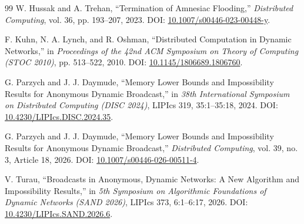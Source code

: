 \documentclass[11pt]{article}
\begin{document}
\begin{thebibliography}{99}
W. Hussak and A. Trehan,
``Termination of Amnesiac Flooding,''
\emph{Distributed Computing}, vol. 36, pp. 193--207, 2023.
DOI: \href{https://doi.org/10.1007/s00446-023-00448-y}{10.1007/s00446-023-00448-y}.

F. Kuhn, N. A. Lynch, and R. Oshman,
``Distributed Computation in Dynamic Networks,''
in \emph{Proceedings of the 42nd ACM Symposium on Theory of Computing (STOC 2010)},
pp. 513--522, 2010.
DOI: \href{https://doi.org/10.1145/1806689.1806760}{10.1145/1806689.1806760}.

G. Parzych and J. J. Daymude,
``Memory Lower Bounds and Impossibility Results for Anonymous Dynamic Broadcast,''
in \emph{38th International Symposium on Distributed Computing (DISC 2024)},
LIPIcs 319, 35:1--35:18, 2024.
DOI: \href{https://doi.org/10.4230/LIPIcs.DISC.2024.35}{10.4230/LIPIcs.DISC.2024.35}.

G. Parzych and J. J. Daymude,
``Memory Lower Bounds and Impossibility Results for Anonymous Dynamic Broadcast,''
\emph{Distributed Computing}, vol. 39, no. 3, Article 18, 2026.
DOI: \href{https://doi.org/10.1007/s00446-026-00511-4}{10.1007/s00446-026-00511-4}.

V. Turau,
``Broadcasts in Anonymous, Dynamic Networks: A New Algorithm and Impossibility Results,''
in \emph{5th Symposium on Algorithmic Foundations of Dynamic Networks (SAND 2026)},
LIPIcs 373, 6:1--6:17, 2026.
DOI: \href{https://doi.org/10.4230/LIPIcs.SAND.2026.6}{10.4230/LIPIcs.SAND.2026.6}.

\end{thebibliography}
\normalsize
\end{document}
